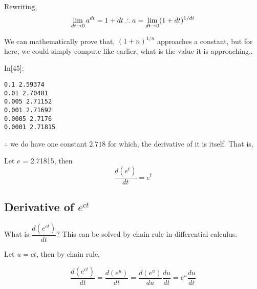 \documentclass[float=false,crop=false]{standalone}
\begin{document}
Rewriting, \[
\lim_{dt \to 0} a^{dt} = 1 + dt \\
\therefore a = \lim_{dt \to 0} (1 + dt)^{1/dt} \\
\]

    We can mathematically prove that, \((1+n)^{1/n}\) approaches a constant,
but for here, we could simply compute like earlier, what is the value it
is approaching..
\begin{InVerbatim}[commandchars=\\\{\},fontsize=\scriptsize]
{\color{incolor}In[{\color{incolor}45}]:}   \PY{p}{[}    \PY{p}{]}
           \PY{p}{[}       \PY{p}{]}
\end{InVerbatim}
    \begin{Verbatim}[commandchars=\\\{\},fontsize=\footnotesize]
0.1 2.59374
0.01 2.70481
0.005 2.71152
0.001 2.71692
0.0005 2.7176
0.0001 2.71815

    \end{Verbatim}

    \(\therefore\) we do have one constant \(2.718\) for which, the
derivative of it is itself. That is,
\begin{tcolorbox}[colback=green!5,colframe=green!40!black,title=The value of $e$]
Let $e$ = 2.71815, then
\begin{equation}
    \dfrac{d(e^t)}{dt} = e^t  \label{eq:MA01}
\end{equation}
\end{tcolorbox}
    \subsection{\texorpdfstring{Derivative of
\(e^{ct}\)}{Derivative of e\^{}\{ct\}}}\label{derivative-of-ect}

What is \(\dfrac{d(e^{ct})}{dt}\)? This can be solved by chain rule in
differential calculus.

Let \(u = ct\), then by chain rule,

\[
\dfrac{d(e^{ct})}{dt} = \dfrac{d(e^u)}{dt} = \dfrac{d(e^u)}{du}\dfrac{du}{dt} = e^u\dfrac{du}{dt}
\]
\end{document}
